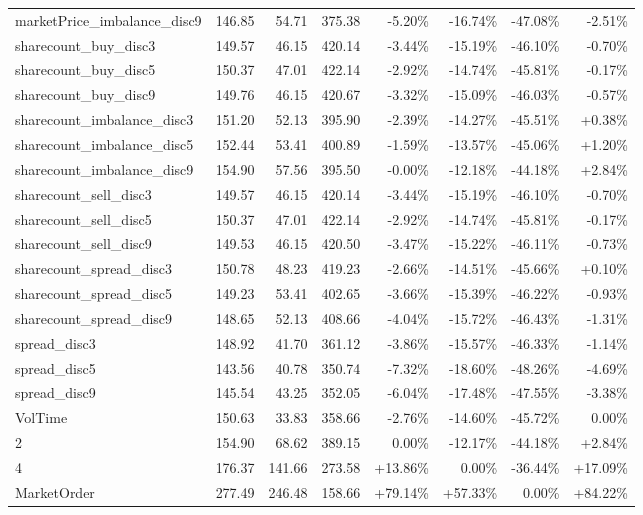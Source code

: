 \begin{table}[ht]
{\begin{tabular}{|lRRR|RRRR|}
marketPrice\_imbalance\_disc9      &    146.85 &   54.71 &  375.38 &   -5.20\% &  -16.74\% &  -47.08\% &       -2.51\% \\
sharecount\_buy\_disc3         &    149.57 &   46.15 &  420.14 &   -3.44\% &  -15.19\% &  -46.10\% &       -0.70\% \\
sharecount\_buy\_disc5         &    150.37 &   47.01 &  422.14 &   -2.92\% &  -14.74\% &  -45.81\% &       -0.17\% \\
sharecount\_buy\_disc9         &    149.76 &   46.15 &  420.67 &   -3.32\% &  -15.09\% &  -46.03\% &       -0.57\% \\
sharecount\_imbalance\_disc3   &    151.20 &   52.13 &  395.90 &   -2.39\% &  -14.27\% &  -45.51\% &        +0.38\% \\
sharecount\_imbalance\_disc5   &    152.44 &   53.41 &  400.89 &   -1.59\% &  -13.57\% &  -45.06\% &        +1.20\% \\
sharecount\_imbalance\_disc9   &    154.90 &   57.56 &  395.50 &   -0.00\% &  -12.18\% &  -44.18\% &        +2.84\% \\
sharecount\_sell\_disc3        &    149.57 &   46.15 &  420.14 &   -3.44\% &  -15.19\% &  -46.10\% &       -0.70\% \\
sharecount\_sell\_disc5        &    150.37 &   47.01 &  422.14 &   -2.92\% &  -14.74\% &  -45.81\% &       -0.17\% \\
sharecount\_sell\_disc9        &    149.53 &   46.15 &  420.50 &   -3.47\% &  -15.22\% &  -46.11\% &       -0.73\% \\
sharecount\_spread\_disc3      &    150.78 &   48.23 &  419.23 &   -2.66\% &  -14.51\% &  -45.66\% &        +0.10\% \\
sharecount\_spread\_disc5      &    149.23 &   53.41 &  402.65 &   -3.66\% &  -15.39\% &  -46.22\% &       -0.93\% \\
sharecount\_spread\_disc9      &    148.65 &   52.13 &  408.66 &   -4.04\% &  -15.72\% &  -46.43\% &       -1.31\% \\
spread\_disc3                 &    148.92 &   41.70 &  361.12 &   -3.86\% &  -15.57\% &  -46.33\% &       -1.14\% \\
spread\_disc5                 &    143.56 &   40.78 &  350.74 &   -7.32\% &  -18.60\% &  -48.26\% &       -4.69\% \\
spread\_disc9                 &    145.54 &   43.25 &  352.05 &   -6.04\% &  -17.48\% &  -47.55\% &       -3.38\% \\
\midrule
VolTime                      &    150.63 &   33.83 &  358.66 &   -2.76\% &  -14.60\% &  -45.72\% &        0.00\% \\
2                            &    154.90 &   68.62 &  389.15 &    0.00\% &  -12.17\% &  -44.18\% &        +2.84\% \\
4                            &    176.37 &  141.66 &  273.58 &   +13.86\% &    0.00\% &  -36.44\% &       +17.09\% \\
MarketOrder                  &    277.49 &  246.48 &  158.66 &   +79.14\% &   +57.33\% &    0.00\% &       +84.22\% \\
\bottomrule
\end{tabular}
}


\end{table}
